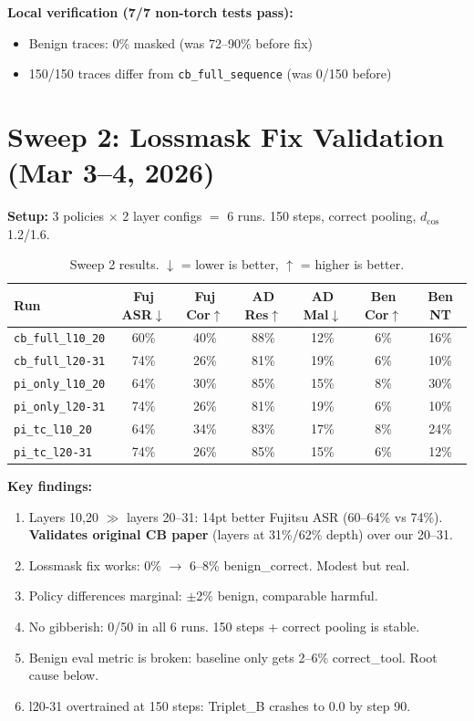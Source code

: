 \documentclass[11pt]{article}
\newcommand{\good}[1]{\textcolor{good}{#1}}
\newcommand{\bad}[1]{\textcolor{bad}{#1}}
\begin{document}
\textbf{Local verification (7/7 non-torch tests pass):}
\begin{itemize}
  \item Benign traces: 0\% masked (\good{was 72--90\% before fix})
  \item 150/150 traces differ from \texttt{cb\_full\_sequence} (was 0/150 before)
\end{itemize}

\section{Sweep 2: Lossmask Fix Validation (Mar 3--4, 2026)}

\textbf{Setup:} 3 policies $\times$ 2 layer configs $=$ 6 runs. 150 steps, correct pooling, $d_\mathrm{cos}$ 1.2/1.6.

\begin{table}[h]
\centering
\small
\begin{tabular}{lcccccc}
\toprule
Run & Fuj ASR$\downarrow$ & Fuj Cor$\uparrow$ & AD Res$\uparrow$ & AD Mal$\downarrow$ & Ben Cor$\uparrow$ & Ben NT \\
\midrule
\texttt{cb\_full\_l10\_20}    & \good{60\%} & \good{40\%} & \good{88\%} & 12\% & 6\% & 16\% \\
\texttt{cb\_full\_l20-31}     & 74\% & 26\% & 81\% & 19\% & 6\% & 10\% \\
\texttt{pi\_only\_l10\_20}    & 64\% & 30\% & 85\% & 15\% & 8\% & 30\% \\
\texttt{pi\_only\_l20-31}     & 74\% & 26\% & 81\% & 19\% & 6\% & 10\% \\
\texttt{pi\_tc\_l10\_20}      & 64\% & 34\% & 83\% & 17\% & 8\% & 24\% \\
\texttt{pi\_tc\_l20-31}       & 74\% & 26\% & 85\% & 15\% & 6\% & 12\% \\
\bottomrule
\end{tabular}
\caption{Sweep 2 results. $\downarrow$ = lower is better, $\uparrow$ = higher is better.}
\end{table}

\textbf{Key findings:}
\begin{enumerate}
  \item \good{Layers 10,20 $\gg$ layers 20--31}: 14pt better Fujitsu ASR (60--64\% vs 74\%). \textbf{Validates original CB paper} (layers at 31\%/62\% depth) over our 20--31.
  \item \good{Lossmask fix works}: 0\% $\to$ 6--8\% benign\_correct. Modest but real.
  \item Policy differences marginal: $\pm$2\% benign, comparable harmful.
  \item \good{No gibberish}: 0/50 in all 6 runs. 150 steps + correct pooling is stable.
  \item \bad{Benign eval metric is broken}: baseline only gets 2--6\% correct\_tool. Root cause below.
  \item \bad{l20-31 overtrained at 150 steps}: Triplet\_B crashes to 0.0 by step 90.
\end{enumerate}
\end{document}
